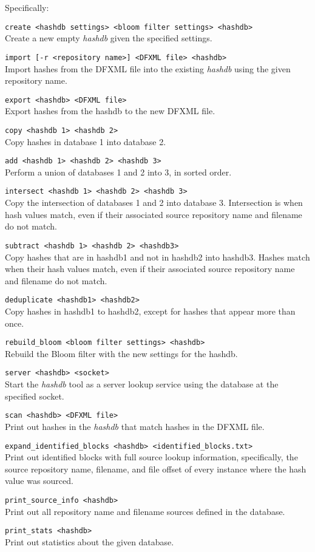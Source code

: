 \documentclass[12pt,twoside]{article}
\newcommand{\hdb}{\emph{hashdb}\xspace}
\begin{document}
Specifically:
\begin{compactitem}
\item \texttt{create <hashdb settings> <bloom filter settings> <hashdb>} \\
Create a new empty \hdb given the specified settings.
\item \texttt{import [-r <repository name>] <DFXML file> <hashdb>} \\
Import hashes from the DFXML file into the existing \hdb
using the given repository name.
\item \texttt{export <hashdb> <DFXML file>} \\
Export hashes from the hashdb to the new DFXML file.
\item \texttt{copy <hashdb 1> <hashdb 2>} \\
Copy hashes in database 1 into database 2.
\item \texttt{add <hashdb 1> <hashdb 2> <hashdb 3>} \\
Perform a union of databases 1 and 2 into 3, in sorted order.
\item \texttt{intersect <hashdb 1> <hashdb 2> <hashdb 3>} \\
Copy the intersection of databases 1 and 2 into database 3.
Intersection is when hash values match, even if their associated source
repository name and filename do not match.
\item \texttt{subtract <hashdb 1> <hashdb 2> <hashdb3>} \\
Copy hashes that are in hashdb1 and not in hashdb2 into hashdb3.
Hashes match when their hash values match, even if their associated source
repository name and filename do not match.
\item \texttt{deduplicate <hashdb1> <hashdb2>} \\
Copy hashes in hashdb1 to hashdb2,
except for hashes that appear more than once.
\item \texttt{rebuild\_bloom <bloom filter settings> <hashdb>} \\
Rebuild the Bloom filter with the new settings for the hashdb.
\item \texttt{server <hashdb> <socket>} \\
Start the \hdb tool as a server lookup service using the database
at the specified socket.
\item \texttt{scan <hashdb> <DFXML file>} \\
Print out hashes in the \hdb that match hashes in the DFXML file.
\item \texttt{expand\_identified\_blocks <hashdb> <identified\_blocks.txt>} \\
Print out identified blocks with full source lookup information,
specifically, the source repository name, filename, and file offset
of every instance where the hash value was sourced.
\item \texttt{print\_source\_info <hashdb>} \\
Print out all repository name and filename sources defined in the database.
\item \texttt{print\_stats <hashdb>} \\
Print out statistics about the given database.
\end{compactitem}
\end{document}
